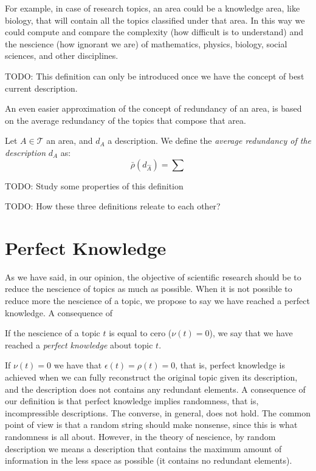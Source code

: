 For example, in case of research topics, an area could be a knowledge area, like biology, that will contain all the topics classified under that area. In this way we could compute and compare the complexity (how difficult is to understand) and the nescience (how ignorant we are) of mathematics, physics, biology, social sciences, and other disciplines.

{\color{red} TODO: This definition can only be introduced once we have the concept of best current description.}

An even easier approximation of the concept of redundancy of an area, is based on the average redundancy of the topics that compose that area.

\begin{definition}
Let $A \in \mathcal{T}$ an area, and $d_A$ a description. We define the \emph{average redundancy of the description} $d_A$ as:
\[
\bar{\rho}(d_{\hat{A}}) = \sum
\]
\end{definition}

{\color{red} TODO: Study some properties of this definition}

{\color{red} TODO: How these three definitions releate to each other?}


%
%

\section{Perfect Knowledge}

As we have said, in our opinion, the objective of scientific research should be to reduce the nescience of topics as much as possible. When it is not possible to reduce more the nescience of a topic, we propose to say we have reached a perfect knowledge. A consequence of 

\begin{definition}
If the nescience of a topic $t$ is equal to cero ($\nu(t)=0$), we say that we have reached a \emph{perfect knowledge} about topic $t$.
\end{definition}

If $\nu(t)=0$ we have that $\epsilon(t) = \rho(t) = 0$, that is, perfect knowledge is achieved when we can fully reconstruct the original topic given its description, and the description does not contains any redundant elements. A consequence of our definition is that perfect knowledge implies randomness, that is, incompressible descriptions. The converse, in general, does not hold. The common point of view is that a random string should make nonsense, since this is what randomness is all about. However, in the theory of nescience, by random description we means a description that contains the maximum amount of information in the less space as possible (it contains no redundant elements).

